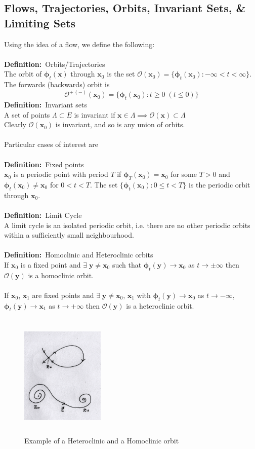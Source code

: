 \documentclass{article}
\newcommand{\cO}{\mathcal{O}}                               %
\newcommand{\definition}{\textbf{Definition:}}              %
\newcommand{\bp}{\bm{\phi}}                                 %
\begin{document}
\subsection{Flows, Trajectories, Orbits, Invariant Sets, \& Limiting Sets}
Using the idea of a flow, we define the following:
\\
\\
\definition\ Orbits/Trajectories
\\
 The orbit of $\bp_t(\bm{x})$ through $\bm{x}_0$ is
the set $\cO(\bm{x}_0) = \{ \bp_t(\bm{x}_0): -\infty < t < \infty \}$.
\\
The forwards (backwards) orbit is 
\[\cO^{+ \, (-)}(\bm{x}_0) = \{ \bp_t(\bm{x}_0):  t \geq 0 \; (t \leq 0) \} \]
\definition\ Invariant sets
\\
A set of points $\Lambda \subset E$ is invariant if
$\bm{x} \in \Lambda \implies \cO(\bm{x}) \subset \Lambda$
\\
Clearly $\cO(\bm{x}_0)$ is invariant, and so is any union of orbits.
\\
\\
Particular cases of interest are
\\
\\
\definition\ Fixed points
\\
$\bm{x}_0$ is a periodic point with period $T$ if $\bp_T(\bm{x}_0)= \bm{x}_0$
for some $T>0$ and $\bp_t (\bm{x}_0) \neq \bm{x}_0$ for $0 < t < T$.
The set $ \{ \bp_t ( \bm{x}_0) : 0 \leq t < T \}$ is the periodic orbit
through $\bm{x}_0$.
\\
\\
\definition\ Limit Cycle
\\
A limit cycle is an isolated periodic orbit, i.e. there are no other periodic
orbits within a sufficiently small neighbourhood.
\\
\\
\definition\ Homoclinic and Heteroclinic orbits
\\
If $\bm{x}_0$ is a fixed point and $\exists \; \bm{y} \neq \bm{x}_0$ such that
$\bp_t(\bm{y}) \to \bm{x}_0$ as $t \to \pm \infty$ then 
$\cO(\bm{y})$ is a homoclinic orbit.
\\
\\
If $\bm{x}_0$, $\bm{x}_1$ are fixed points and 
$\exists \; \bm{y} \neq \bm{x}_0 , \, \bm{x}_1$ with $\bp_t (\bm{y}) \to \bm{x}_0$
as $t \to - \infty$, $\bp_t(\bm{y}) \to \bm{x}_1$ as $t \to + \infty$ then
$\cO(\bm{y})$ is a heteroclinic orbit.
%
\begin{figure}[H]
\centering\caption*{Example of a Heteroclinic and a Homoclinic orbit}
\includegraphics[width=4cm, height=6cm]{fig3.png}
\end{figure}
\end{document}
